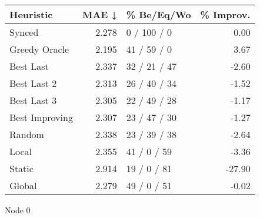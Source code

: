 \begin{tabular}{lrlr}
\toprule
\textbf{Heuristic} & \textbf{MAE ↓} & \textbf{\% Be/Eq/Wo} & \textbf{\% Improv.} \\
\midrule
            Synced &          2.278 &          0 / 100 / 0 &                0.00 \\
     Greedy Oracle &          2.195 &          41 / 59 / 0 &                3.67 \\
         Best Last &          2.337 &         32 / 21 / 47 &               -2.60 \\
       Best Last 2 &          2.313 &         26 / 40 / 34 &               -1.52 \\
       Best Last 3 &          2.305 &         22 / 49 / 28 &               -1.17 \\
    Best Improving &          2.307 &         23 / 47 / 30 &               -1.27 \\
            Random &          2.338 &         23 / 39 / 38 &               -2.64 \\
             Local &          2.355 &          41 / 0 / 59 &               -3.36 \\
            Static &          2.914 &          19 / 0 / 81 &              -27.90 \\
            Global &          2.279 &          49 / 0 / 51 &               -0.02 \\
\bottomrule
\end{tabular}
\caption{Node 0}
\label{tab:hr_iid_lr05_le1_bs2_0}
